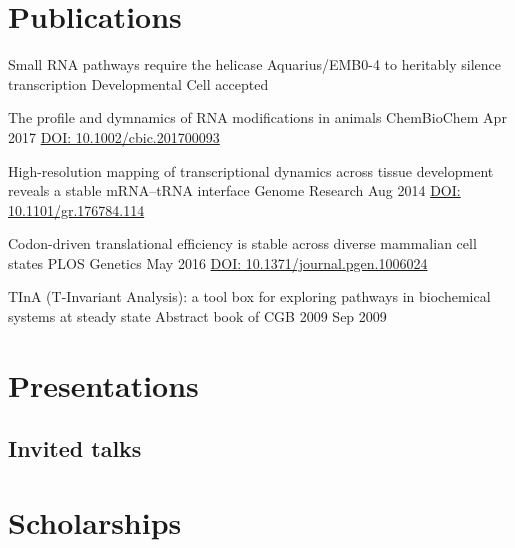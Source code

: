 \documentclass{klmr-cv}
\begin{document}
\section{Publications}


\begin{bibliography}
    {Small RNA pathways require the helicase Aquarius/EMB0-4 to heritably
        silence transcription}
    {Developmental Cell}
    {accepted}
    {}

    {The profile and dymnamics of RNA modifications in animals}
    {ChemBioChem}
    {Apr 2017}
    {\href{http://dx.doi.org/10.1002/cbic.201700093}{DOI:
        10.1002/cbic.201700093}}

    {High-resolution mapping of transcriptional dynamics across tissue
        development reveals a stable mRNA--tRNA interface}
    {Genome Research}
    {Aug 2014}
    {\href{http://dx.doi.org/10.1101/gr.176784.114}{DOI: 10.1101/gr.176784.114}}

    {Codon-driven translational efficiency is stable across diverse mammalian
        cell states}
    {PLOS Genetics}
    {May 2016}
    {\href{http://dx.doi.org/10.1371/journal.pgen.1006024}{DOI:
        10.1371/journal.pgen.1006024}}

    {TInA (T-Invariant Analysis): a tool box for exploring pathways in
        biochemical systems at steady state}
    {Abstract book of CGB 2009}
    {Sep 2009}
    {}
\end{bibliography}

\section{Presentations}

\subsection{Invited talks}

\section{Scholarships}
\end{document}

